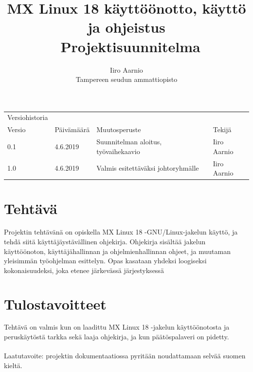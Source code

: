 \documentclass[a4paper, 12pt, finnish]{article}
\begin{document}
\title{MX Linux 18 käyttöönotto, käyttö ja ohjeistus \\ \large Projektisuunnitelma}
\author{Iiro Aarnio\\ Tampereen seudun ammattiopisto}
\maketitle
\thispagestyle{empty}
\newpage
\thispagestyle{empty}
\newpage
\begin{table}[htpb]
\begin{tabular}{llll}
Versiohistoria &            &                         &             \\
\rowcolor[HTML]{FFCCC9}
Versio         & Päivämäärä & Muutosperuste           & Tekijä      \\
0.1              & 4.6.2019   & Suunnitelman aloitus, työvaihekaavio       & Iiro Aarnio \\
1.0 & 4.6.2019 & Valmis esitettäväksi johtoryhmälle & Iiro Aarnio \\
\end{tabular}
\end{table}

\newpage
\thispagestyle{empty}
\tableofcontents
\newpage
\section{Tehtävä}
Projektin tehtävänä on opiskella MX Linux 18 -GNU/Linux-jakelun käyttö, ja tehdä siitä käyttäjäystävällinen ohjekirja. Ohjekirja sisältää jakelun käyttöönoton, käyttäjähallinnan ja ohjelmienhallinnan ohjeet, ja muutaman yleisimmän työohjelman esittelyn. Opas kasataan yhdeksi loogiseksi kokonaisuudeksi, joka etenee järkevässä järjestyksessä

\section{Tulostavoitteet}
Tehtävä on valmis kun on laadittu MX Linux 18 -jakelun käyttöönotosta ja peruskäytöstä tarkka sekä laaja ohjekirja, ja kun päätöspalaveri on pidetty.
\\\\
Laatutavoite: projektin dokumentaatiossa pyritään noudattamaan selvää suomen kieltä.
\end{document}
